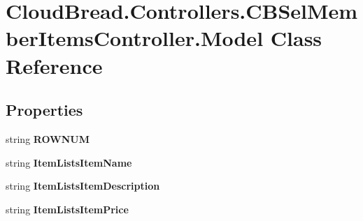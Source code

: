 \hypertarget{class_cloud_bread_1_1_controllers_1_1_c_b_sel_member_items_controller_1_1_model}{}\section{Cloud\+Bread.\+Controllers.\+C\+B\+Sel\+Member\+Items\+Controller.\+Model Class Reference}
\label{class_cloud_bread_1_1_controllers_1_1_c_b_sel_member_items_controller_1_1_model}
\subsection*{Properties}
\begin{DoxyCompactItemize}
\item 
string {\bfseries R\+O\+W\+N\+UM}\hypertarget{class_cloud_bread_1_1_controllers_1_1_c_b_sel_member_items_controller_1_1_model_a01971bab9e92a07d9a7fd2af003a482a}{}\label{class_cloud_bread_1_1_controllers_1_1_c_b_sel_member_items_controller_1_1_model_a01971bab9e92a07d9a7fd2af003a482a}

\item 
string {\bfseries Item\+Lists\+Item\+Name}\hypertarget{class_cloud_bread_1_1_controllers_1_1_c_b_sel_member_items_controller_1_1_model_abb12a70b3f724006adffd3708483435f}{}\label{class_cloud_bread_1_1_controllers_1_1_c_b_sel_member_items_controller_1_1_model_abb12a70b3f724006adffd3708483435f}

\item 
string {\bfseries Item\+Lists\+Item\+Description}\hypertarget{class_cloud_bread_1_1_controllers_1_1_c_b_sel_member_items_controller_1_1_model_a2913b144d9f9f82ff1536460001009df}{}\label{class_cloud_bread_1_1_controllers_1_1_c_b_sel_member_items_controller_1_1_model_a2913b144d9f9f82ff1536460001009df}

\item 
string {\bfseries Item\+Lists\+Item\+Price}\hypertarget{class_cloud_bread_1_1_controllers_1_1_c_b_sel_member_items_controller_1_1_model_a14b04d6b2693b55cfa94cfd8757fbaf4}{}\label{class_cloud_bread_1_1_controllers_1_1_c_b_sel_member_items_controller_1_1_model_a14b04d6b2693b55cfa94cfd8757fbaf4}


\end{DoxyCompactItemize}
